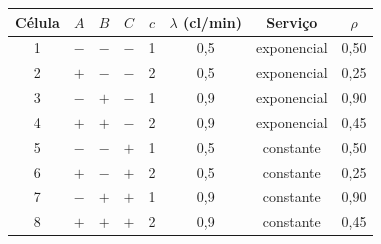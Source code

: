 \begin{tabular}{cccccccc}
\toprule
Célula & $A$ & $B$ & $C$ & $c$ & $\lambda$ (cl/min) & Serviço & $\rho$ \\
\midrule
1 & $-$ & $-$ & $-$ & 1 & 0,5 & exponencial & 0,50 \\
2 & $+$ & $-$ & $-$ & 2 & 0,5 & exponencial & 0,25 \\
3 & $-$ & $+$ & $-$ & 1 & 0,9 & exponencial & 0,90 \\
4 & $+$ & $+$ & $-$ & 2 & 0,9 & exponencial & 0,45 \\
5 & $-$ & $-$ & $+$ & 1 & 0,5 & constante & 0,50 \\
6 & $+$ & $-$ & $+$ & 2 & 0,5 & constante & 0,25 \\
7 & $-$ & $+$ & $+$ & 1 & 0,9 & constante & 0,90 \\
8 & $+$ & $+$ & $+$ & 2 & 0,9 & constante & 0,45 \\
\bottomrule
\end{tabular}
